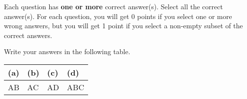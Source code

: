 
Each question has \textbf{one or more} correct answer(s). Select all the correct answer(s). For each question, you will get 0 points if you select one or more wrong answers, but you will get 1 point if you select a non-empty subset of the correct answers.

Write your answers in the following table.

\begin{table}[htbp]
	\centering
	\begin{tabular}{|p{2cm}|p{2cm}|p{2cm}|p{2cm}|}
		\hline
		(a) & (b) & (c) & (d) \\
		\hline
		AB  & AC  & AD  & ABC \\
		\hline
	\end{tabular}
\end{table}

